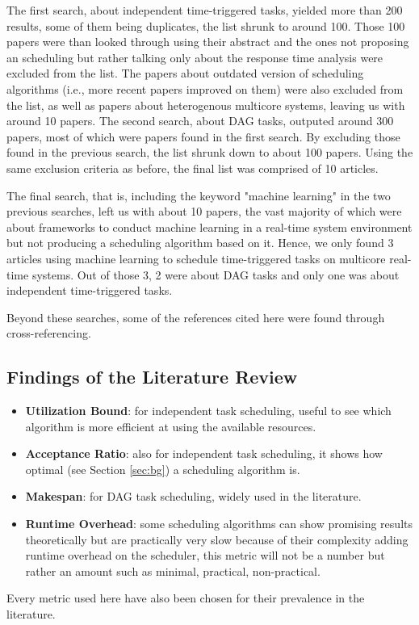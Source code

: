 The first search, about independent time-triggered tasks, yielded more than 200 results,
some of them being duplicates,
the list shrunk to around 100.
Those 100 papers were than looked through using their abstract 
and the ones not proposing an scheduling but rather talking 
only about the response time analysis were excluded from the list.
The papers about outdated version of scheduling algorithms (i.e.,
more recent papers improved on them) were also excluded from the list,
as well as papers about heterogenous multicore systems,
leaving us with around 10 papers.
The second search, about DAG tasks, outputed around 300 papers,
most of which were papers found in the first search.
By excluding those found in the previous search, 
the list shrunk down to about 100 papers.
Using the same exclusion criteria as before, 
the final list was comprised of 10 articles.

The final search, that is, including the keyword "machine learning"
in the two previous searches, left us with about 10 papers,
the vast majority of which were about frameworks to conduct machine learning
in a real-time system environment but not producing a scheduling algorithm based on it.
Hence, we only found 3 articles using machine learning to
schedule time-triggered tasks on multicore real-time systems.
Out of those 3, 2 were about DAG tasks and only one was
about independent time-triggered tasks.

Beyond these searches, some of the references cited here
were found through cross-referencing.

\subsection{Findings of the Literature Review}

\begin{itemize}
    \item \textbf{Utilization Bound}: for independent task scheduling, useful to see which algorithm is more efficient at using the available resources.
    \item \textbf{Acceptance Ratio}: also for independent task scheduling, it shows how optimal (see Section \ref{sec:bg}) a scheduling algorithm is.
    \item \textbf{Makespan}: for DAG task scheduling, widely used in the literature.
    \item \textbf{Runtime Overhead}: some scheduling algorithms can show promising results theoretically but are practically very slow because 
    of their complexity adding runtime overhead on the scheduler, this metric will not be a number but rather an amount such as minimal, practical, non-practical.
\end{itemize}
Every metric used here have also been chosen for their prevalence in the literature.

